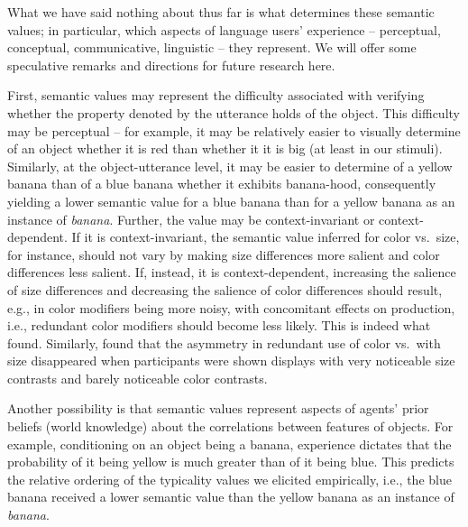 \documentclass[11pt]{article}
\begin{document}
What we have said nothing about thus far is what determines these semantic values; in particular, which aspects of language users' experience -- perceptual, conceptual, communicative, linguistic -- they represent. We will offer some speculative remarks and directions for future research here. 

First, semantic values may  represent the difficulty associated with verifying whether the property denoted by the utterance holds of the object. This difficulty may be perceptual -- for example, it may be relatively easier to visually determine of an object whether it is red than whether it it is big (at least in our stimuli). Similarly, at the object-utterance level, it may be easier to determine of a yellow banana than of a blue banana whether it exhibits banana-hood,  consequently yielding a lower semantic value for a blue banana than for a yellow banana as an instance of \emph{banana}. Further, the value may be context-invariant or context-dependent. If it is context-invariant, the semantic value inferred for color vs.~size, for instance, should not vary by making size differences more salient and color differences less salient. If, instead, it is context-dependent, increasing the salience of size differences and decreasing the salience of color differences should result, e.g.,  in  color modifiers being more noisy, with concomitant effects on production, i.e., redundant color modifiers should become less likely. This is indeed what  found. Similarly,  found that the asymmetry in redundant use of color vs.~with size disappeared when participants were shown displays with very noticeable size contrasts and barely noticeable color contrasts.

Another possibility is that semantic values represent aspects of agents' prior beliefs (world knowledge) about the correlations between features of objects. For example, conditioning on an object being a banana, experience dictates that the probability of it being yellow is much greater than of it being blue. This predicts the relative ordering of the typicality values we elicited empirically, i.e., the blue banana received a lower semantic value than the yellow banana as an instance of \emph{banana}.  
\end{document}
